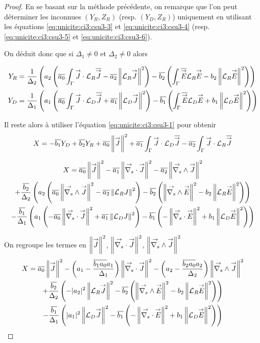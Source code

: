   \begin{proof}
    En se basant sur la méthode précédente, on remarque que l'on peut déterminer les inconnues \((Y_R,Z_R)\) (resp. \((Y_D,Z_R)\)) uniquement en utilisant les équations \eqref{eq:unicite:ci3:csu3-3} et \eqref{eq:unicite:ci3:csu3-4} (resp. \eqref{eq:unicite:ci3:csu3-5} et \eqref{eq:unicite:ci3:csu3-6}).

    On déduit donc que si \(\Delta_1 \not = 0\) et \(\Delta_2 \not = 0\) alors

    \begin{align}
      Y_R &= \frac{1}{\Delta_2}\left(a_2\left(\conj{a_0}\int_\Gamma \vJ\cdot\LR\conj{\vJ} - \conj{a_2}\norm{\LR \vJ}^2\right)  -\conj{b_2}\left(\int_\Gamma \conj{\vE}\LR{\vE} - b_2 \norm{\LR \vE}^2\right)\right) \\
      Y_D &= \frac{1}{\Delta_1}\left(a_1\left(\conj{a_0}\int_\Gamma \vJ\cdot\LD\conj{\vJ} + \conj{a_1}\norm{\LD \vJ}^2\right)  -\conj{b_1}\left(\int_\Gamma \conj{\vE}\LD{\vE} + b_1 \norm{\LD \vE}^2\right)\right)
    \end{align}

    Il reste alors à utiliser l'équation \eqref{eq:unicite:ci3:csu3-1} pour obtenir
    \begin{equation}
      X = -\conj{b_1} Y_D + \conj{b_2} Y_R + \conj{a_0} \norm{\vJ}^2 + \conj{a_1} \int_\Gamma \vJ \cdot \LD \conj{\vJ} - \conj{a_2} \int_\Gamma \vJ \cdot \LR \conj{\vJ}
    \end{equation}

    \begin{multline}
      X = \conj{a_0} \norm{\vJ }^2 - \conj{a_1} \norm{\vdivs \vJ }^2 - \conj{a_2} \norm{\vrots \vJ }^2
      \\
      + \frac{\conj{b_2}}{\Delta_2}\left(a_2\left(\conj{a_0}\norm{\vrots \vJ}^2 - \conj{a_2}\norm{\LR J}^2\right)  -\conj{b_2}\left(\norm{\vrots\vE}^2 - b_2 \norm{\LR \vE }^2\right)\right)
      \\
      - \frac{\conj{b_1}}{\Delta_1}\left(a_1\left(-\conj{a_0}\norm{\vdivs\vJ}^2 + \conj{a_1}\norm{\LD J}^2\right)  -\conj{b_1}\left(-\norm{\vdivs\vE}^2 + b_1 \norm{\LD \vE }^2\right)\right)
    \end{multline}

    On regroupe les termes en \(\norm{\vJ}^2\), \(\norm{\vdivs\vJ}^2\),  \(\norm{\vrots\vJ}^2\)
    \begin{multline}
      X = \conj{a_0} \norm{\vJ }^2 - \left(a_1 - \frac{\conj{b_1a_0}a_1}{\Delta_1}\right) \norm{\vdivs \vJ}^2 - \left(a_2 - \frac{\conj{b_2a_0}a_2}{\Delta_2}\right) \norm{\vrots \vJ }^2
      \\
      + \frac{\conj{b_2}}{\Delta_2}\left( - |a_2|^2\norm{\LR \vJ}^2  - \conj{b_2}\left(\norm{\vrots\vE}^2 - b_2 \norm{\LR \vE }^2\right)\right) 
      \\
      - \frac{\conj{b_1}}{\Delta_1}\left( |a_1|^2\norm{\LD \vJ}^2  - \conj{b_1}\left(-\norm{\vdivs\vE}^2 + b_1 \norm{\LD \vE }^2\right)\right)
    \end{multline}


\end{proof}
